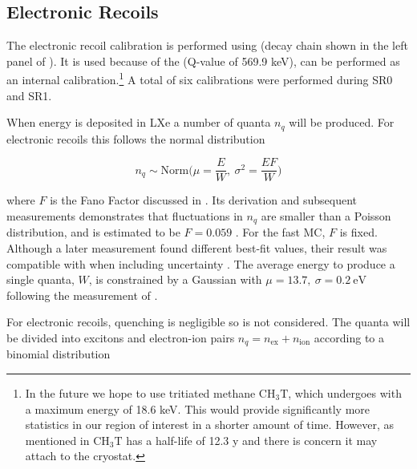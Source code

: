 \subsection{Electronic Recoils}
\label{subsec:er_nr_calibrations_parameter_determ_er}
The electronic recoil calibration is performed using  (decay chain shown in the left panel of
).  It is used because of the  \betadecay (Q-value of 569.9 keV), can
be performed as an internal calibration.\footnote{In the future we hope to use tritiated methane $\mathrm{C H_3 T}$, which undergoes
\betadecay
with a maximum energy of 18.6 keV.  This would provide significantly more statistics in our region of interest in a shorter amount
of time.  However, as mentioned in  $\mathrm{C H_3 T}$ has a half-life of 12.3 y and there
is concern it may attach to the cryostat.}  A total of six calibrations were
performed during SR0 and SR1.

When energy is deposited in LXe a number of quanta $n_q$ will be produced.  For electronic recoils this follows the normal distribution

\vspace{-10pt}

\begin{equation}
n_q \sim \mathrm{Norm} \bigg( \mu = \frac{E}{W},\ \sigma^2 = \frac{E F}{W} \bigg)
\label{eq:er_nr_calibrations_parameter_determ_er_quanta}
\end{equation}

\noindent where $F$ is the Fano Factor  discussed in .  Its derivation and subsequent measurements
demonstrates that fluctuations in $n_q$ are smaller than a Poisson distribution, and is estimated to be $F = 0.059$
.  For the
fast MC, $F$ is fixed.  Although a later measurement found different best-fit values, their result was
compatible with  when including uncertainty .  The average energy to produce a single
quanta, $W$, is constrained by a Gaussian with $\mu = 13.7,\ \sigma = 0.2\ \mathrm{eV}$ following the measurement of .

For electronic recoils, quenching is negligible so is not considered.  The quanta will be divided into excitons and electron-ion pairs
$n_q = n_{\mathrm{ex}} + n_{\mathrm{ion}}$ according to a binomial distribution

\vspace{-10pt}

